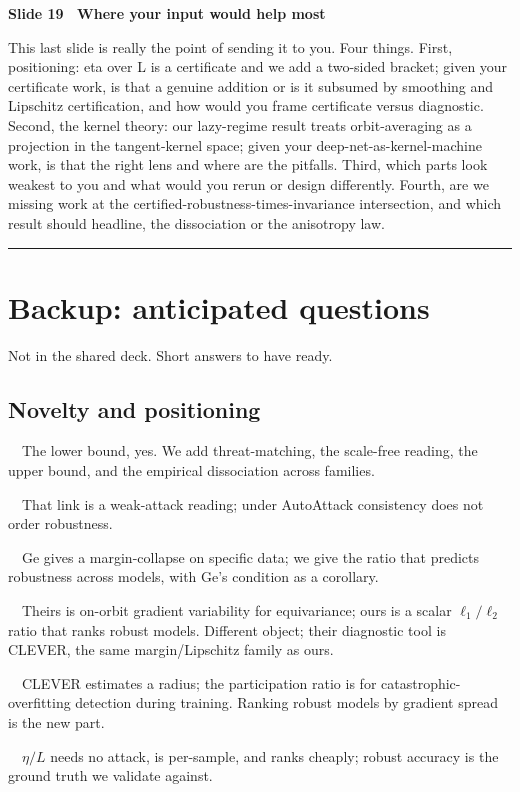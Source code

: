\documentclass[11pt]{article}
\newcommand{\etaL}{\ensuremath{\eta/L}}
\newcommand{\slide}[3]{%
  \par\vspace{0.9em}%
  {\color{TUMblue}\bfseries Slide #1 \textbullet\ #2}\par
  \vspace{0.25em}#3\par}
\newcommand{\qa}[2]{\par\vspace{0.5em}{\bfseries #1}\ \ #2\par}
\begin{document}
\slide{19}{Where your input would help most}{%
This last slide is really the point of sending it to you. Four things. First, positioning: eta over L
is a certificate and we add a two-sided bracket; given your certificate work, is that a genuine
addition or is it subsumed by smoothing and Lipschitz certification, and how would you frame
certificate versus diagnostic. Second, the kernel theory: our lazy-regime result treats orbit-averaging
as a projection in the tangent-kernel space; given your deep-net-as-kernel-machine work, is that the
right lens and where are the pitfalls. Third, which parts look weakest to you and what would you rerun
or design differently. Fourth, are we missing work at the certified-robustness-times-invariance
intersection, and which result should headline, the dissociation or the anisotropy law.}

\vspace{1.2em}
\hrule
\vspace{0.4em}
\section{Backup: anticipated questions}

{\small\color{slate} Not in the shared deck. Short answers to have ready.}

\subsection*{Novelty and positioning}
\qa{1. Is \etaL{} just the Lipschitz--margin bound?}{The lower bound, yes. We add threat-matching, the
scale-free reading, the upper bound, and the empirical dissociation across families.}
\qa{2. Saha/TIPS reports invariance helps. How do you differ?}{That link is a weak-attack reading; under
AutoAttack consistency does not order robustness.}
\qa{3. Ge already showed invariance can hurt.}{Ge gives a margin-collapse on specific data; we give the
ratio that predicts robustness across models, with Ge's condition as a corollary.}
\qa{4. Wang 2025 also uses the word ``anisotropy''.}{Theirs is on-orbit gradient variability for
equivariance; ours is a scalar $\ell_1/\ell_2$ ratio that ranks robust models. Different object; their
diagnostic tool is CLEVER, the same margin/Lipschitz family as ours.}
\qa{5. Is the anisotropy result just CLEVER or the participation ratio?}{CLEVER estimates a radius; the
participation ratio is for catastrophic-overfitting detection during training. Ranking robust models by
gradient spread is the new part.}
\qa{6. Why not just report robust accuracy?}{\etaL{} needs no attack, is per-sample, and ranks cheaply;
robust accuracy is the ground truth we validate against.}
\end{document}
